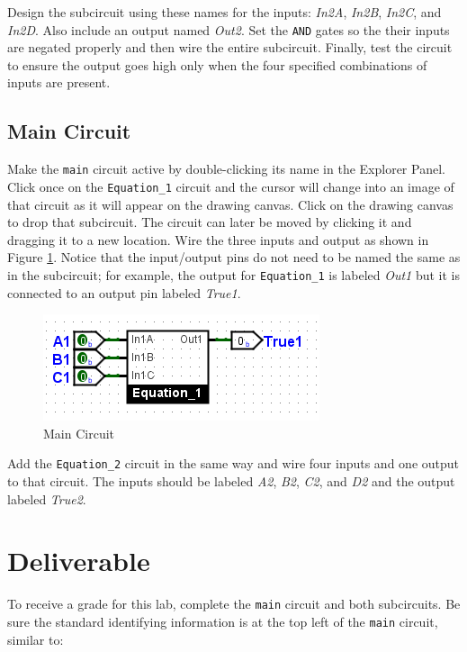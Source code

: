 Design the subcircuit using these names for the inputs: \textit{In2A}, \textit{In2B}, \textit{In2C}, and \textit{In2D}. Also include an output named \textit{Out2}. Set the \texttt{AND} gates so the their inputs are negated properly and then wire the entire subcircuit. Finally, test the circuit to ensure the output goes high only when the four specified combinations of inputs are present.

\subsection{Main Circuit}

Make the \lstinline[columns=fixed]|main| circuit active by double-clicking its name in the Explorer Panel. Click once on the \lstinline[columns=fixed]|Equation_1| circuit and the cursor will change into an image of that circuit as it will appear on the drawing canvas. Click on the drawing canvas to drop that subcircuit. The circuit can later be moved by clicking it and dragging it to a new location. Wire the three inputs and output as shown in Figure \ref{fig:bool-05}. Notice that the input/output pins do not need to be named the same as in the subcircuit; for example, the output for \lstinline[columns=fixed]|Equation_1| is labeled \textit{Out1} but it is connected to an output pin labeled \textit{True1}.

\begin{figure}[H]
	\centering
	\includegraphics[width=\maxwidth{.95\linewidth}]{gfx/bool-05}
	\caption{Main Circuit}
	\label{fig:bool-05}
\end{figure}

Add the \lstinline[columns=fixed]|Equation_2| circuit in the same way and wire four inputs and one output to that circuit. The inputs should be labeled \textit{A2}, \textit{B2}, \textit{C2}, and \textit{D2} and the output labeled \textit{True2}.


\section{Deliverable}

To receive a grade for this lab, complete the \lstinline[columns=fixed]|main| circuit and both subcircuits. Be sure the standard identifying information is at the top left of the \lstinline[columns=fixed]|main| circuit, similar to: 

